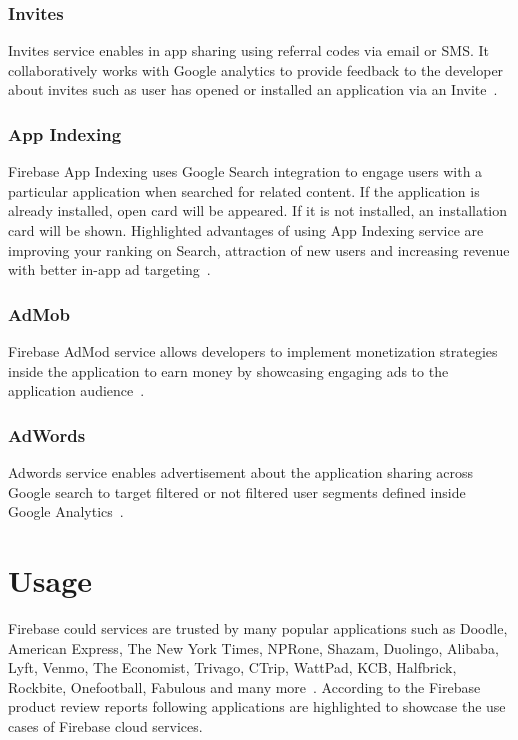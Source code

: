 \subsubsection{Invites} Invites service enables in app sharing using referral
codes via email or SMS. It collaboratively works with Google analytics to
provide feedback to the developer about invites such as user has opened or
installed an application via an Invite~\cite{hid-sp18-409-www-firebase-products,
	hid-sp18-409-www-firebase-invite}.

\subsubsection{App Indexing} Firebase App Indexing uses Google Search
integration to engage users with a particular application when searched for
related content. If the application is already installed, open card will be
appeared. If it is not installed, an installation card will be shown.
Highlighted advantages of using App Indexing service are improving your ranking
on Search, attraction of new users and increasing revenue with better in-app ad
targeting~\cite{hid-sp18-409-www-firebase-products}.

\subsubsection{AdMob} Firebase AdMod service allows developers to implement
monetization strategies inside the application to earn money by showcasing
engaging ads to the application audience~\cite{hid-sp18-409-www-firebase-admob}.

\subsubsection{AdWords} Adwords service enables advertisement about the
application  sharing across Google search to target filtered or not filtered
user segments defined inside Google
Analytics~\cite{hid-sp18-409-www-firebase-adwords}.

\section{Usage} Firebase could services are trusted by many popular applications
such as Doodle\cite{hid-sp18-409-www-doodle}, American
Express\cite{hid-sp18-409-www-americanexpress}, The New York
Times\cite{hid-sp18-409-www-nytimes}, NPRone\cite{hid-sp18-409-www-npr},
Shazam\cite{hid-sp18-409-www-shazam}, Duolingo\cite{hid-sp18-409-www-duolingo},
Alibaba\cite{hid-sp18-409-www-alibaba}, Lyft\cite{hid-sp18-409-www-lyft},
Venmo\cite{hid-sp18-409-www-venmo}, The
Economist\cite{hid-sp18-409-www-economist},
Trivago\cite{hid-sp18-409-www-trivago}, CTrip\cite{hid-sp18-409-www-ctrip},
WattPad\cite{hid-sp18-409-www-wattpad}, KCB\cite{hid-sp18-409-www-kcbgroup},
Halfbrick\cite{hid-sp18-409-www-halfbrick},
Rockbite\cite{hid-sp18-409-www-rockbitegames},
Onefootball\cite{hid-sp18-409-www-onefootball},
Fabulous\cite{hid-sp18-409-www-thefabulous} and many
more~\cite{hid-sp18-409-www-firebase,hid-sp18-409-www-firebase-usecases}.
According to the Firebase product review reports following applications are
highlighted to showcase the use cases of Firebase cloud services.

